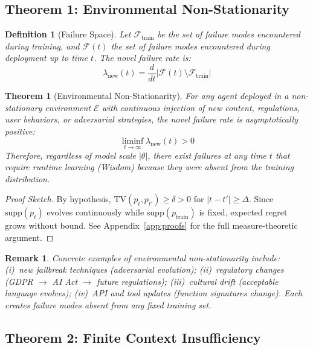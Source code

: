 \documentclass{article}
\newtheorem{theorem}{Theorem}
\newtheorem{definition}{Definition}
\newtheorem{remark}{Remark}
\begin{document}
\subsection{Theorem 1: Environmental Non-Stationarity}

\begin{definition}[Failure Space]
\label{def:failure_space}
Let $\mathcal{F}_{\text{train}}$ be the set of failure modes encountered
during training, and $\mathcal{F}(t)$ the set of failure modes encountered
during deployment up to time $t$. The \emph{novel failure rate} is:
\begin{equation}
  \lambda_{\text{new}}(t) = \frac{d}{dt} |\mathcal{F}(t) \setminus \mathcal{F}_{\text{train}}|
\end{equation}
\end{definition}

\begin{theorem}[Environmental Non-Stationarity]
\label{thm:nonstationary}
For any agent deployed in a non-stationary environment $\mathcal{E}$ with
continuous injection of new content, regulations, user behaviors, or
adversarial strategies, the novel failure rate is asymptotically positive:
\begin{equation}
  \liminf_{t \to \infty} \lambda_{\text{new}}(t) > 0
\end{equation}
Therefore, regardless of model scale $|\theta|$, there exist failures at
any time $t$ that require runtime learning (Wisdom) because they were
absent from the training distribution.
\end{theorem}

\begin{proof}[Proof Sketch]
By hypothesis, $\text{TV}(p_t, p_{t'}) \geq \delta > 0$ for $|t-t'|\geq\Delta$.
Since $\text{supp}(p_t)$ evolves continuously while $\text{supp}(p_{\text{train}})$
is fixed, expected regret grows without bound. See Appendix~\ref{app:proofs} for
the full measure-theoretic argument.
\end{proof}

\begin{remark}
Concrete examples of environmental non-stationarity include:
(i)~new jailbreak techniques (adversarial evolution);
(ii)~regulatory changes (GDPR $\to$ AI Act $\to$ future regulations);
(iii)~cultural drift (acceptable language evolves);
(iv)~API and tool updates (function signatures change).
Each creates failure modes absent from any fixed training set.
\end{remark}

\subsection{Theorem 2: Finite Context Insufficiency}
\end{document}
